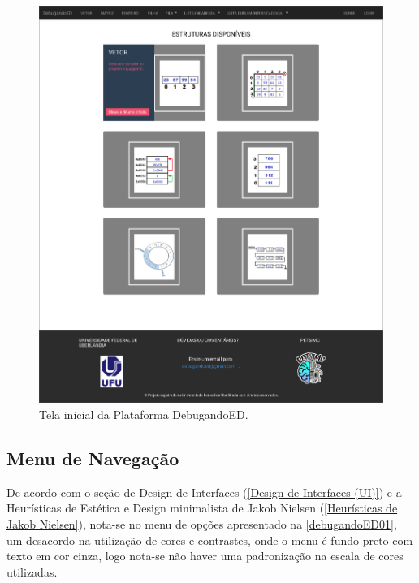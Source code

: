 \begin{figure}[ht]
    \begin{center}
        \includegraphics[scale=0.3]{figs/debugandoED01.png}
    \end{center}
    \caption{\label{debugandoED01}Tela inicial da Plataforma DebugandoED.}
\end{figure}


\subsection{Menu de Navegação}
\label{Menu_de_Navegação}

De acordo com o seção de Design de Interfaces (\autoref{Design de Interfaces (UI)}) e a Heurísticas de Estética e Design minimalista de Jakob Nielsen (\autoref{Heurísticas de Jakob Nielsen}), nota-se no menu de opções apresentado na \autoref{debugandoED01}, um desacordo na utilização de cores e contrastes, onde o menu é fundo preto com texto em cor cinza, logo nota-se não haver uma padronização na escala de cores utilizadas.
    

